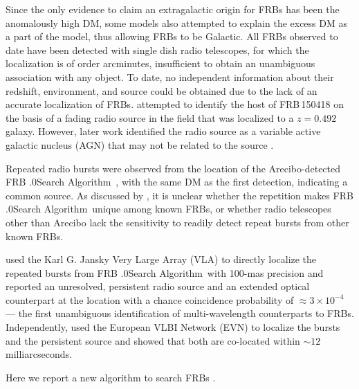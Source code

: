 \documentclass[twocolumn]{aastex61}
\def \frb {FRB .0Search Algorithm}
\begin{document}
Since the only evidence to claim an extragalactic origin for FRBs has been the anomalously high DM, some models also attempted to explain the excess DM as a part of the model, thus allowing FRBs to be Galactic. All FRBs observed to date have been detected with single dish radio telescopes, for which the localization is of order arcminutes, insufficient to obtain an unambiguous association with any object. To date, no independent information about their redshift, environment, and source could be obtained due to the lack of an accurate localization of FRBs. \citet{kjb+16} attempted to identify the host of FRB\,150418 on the basis of a fading radio source in the field that was localized to a $z=0.492$ galaxy. However, later work identified the radio source as a variable active galactic nucleus (AGN) that may not be related to the source \citep{wb16,bbt+16,gmg+16,jkb+16}.

 Repeated radio bursts were observed from the location of the Arecibo-detected \frb\ \citep{ssh+16a,ssh+16b}, with the same DM as the first detection, indicating a common source. As discussed by \citet{ssh+16a}, it is unclear whether the repetition makes \frb\ unique among known FRBs, or whether radio telescopes other than Arecibo lack the sensitivity to readily detect repeat bursts from other known FRBs.

\citet{clw+16} used the Karl G. Jansky Very Large Array (VLA) to directly localize the repeated bursts from \frb\ with 100-mas precision and reported an unresolved, persistent radio source and an extended optical counterpart at the location with a chance coincidence probability of $\approx 3\times10^{-4}$ --- the first unambiguous identification of multi-wavelength counterparts to FRBs. Independently, \citet{mph+16} used the European VLBI Network (EVN) to localize the bursts and the persistent source and showed that both are co-located within $\sim12$ milliarcseconds.

Here we report a new algorithm to search FRBs . 

\end{document}
